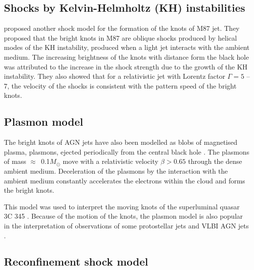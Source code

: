 
\subsection{Shocks by Kelvin-Helmholtz (KH) instabilities}
 \citet{bicknell96} proposed another shock model for the formation of the knots of M87 jet. They proposed that the bright knots in M87 are oblique shocks produced by helical modes of the KH instability, produced when a light jet interacts with the ambient medium. The increasing brightness of the knots with distance form the black hole was attributed to the increase in the shock strength due to the growth of the KH instability. They also showed that for a relativistic jet with Lorentz factor $\Gamma=5$ -- 7, the velocity of the shocks is consistent with the pattern speed of the bright knots. 

\subsection{Plasmon model}
The bright knots of AGN jets have also been modelled as blobs of magnetised plasma, plasmons, ejected periodically from the central black hole \citep{shklovskii77, shklovskii80}. The plasmons of mass $\approx$~0.1$M_{\odot}$ move with a relativistic velocity $\beta >0.65$ through the dense ambient medium. Deceleration of the plasmons by the interaction with the ambient medium constantly accelerates the electrons within the cloud and forms the bright knots.  

This model was used to interpret the moving knots of the superluminal quasar 3C 345 \citep{qian92}. Because of the motion of the knots, the plasmon model is also popular in the interpretation of observations of some protostellar jets \citep{goodson97} and VLBI AGN jets \citep{hough13}.



\subsection{Reconfinement shock model}\label{sec:reconf}

